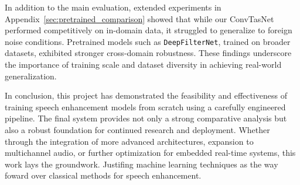 In addition to the main evaluation, extended experiments in Appendix~\ref{sec:pretrained_comparison} showed that while our ConvTasNet performed competitively on in-domain data, it struggled to generalize to foreign noise conditions. Pretrained models such as \texttt{DeepFilterNet}, trained on broader datasets, exhibited stronger cross-domain robustness. These findings underscore the importance of training scale and dataset diversity in achieving real-world generalization.

In conclusion, this project has demonstrated the feasibility and effectiveness of training speech enhancement models from scratch using a carefully engineered pipeline. The final system provides not only a strong comparative analysis but also a robust foundation for continued research and deployment. Whether through the integration of more advanced architectures, expansion to multichannel audio, or further optimization for embedded real-time systems, this work lays the groundwork. Justifing machine learning techniques as the way foward over classical methods for speech enhancement.
